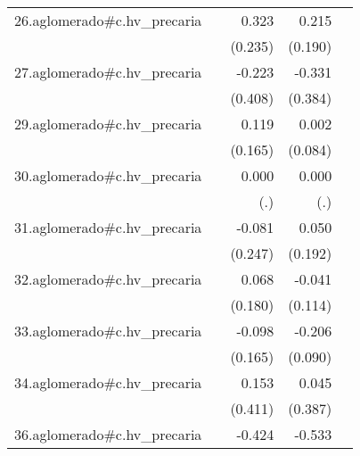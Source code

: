 {\begin{longtable}{l*{4}{D{.}{.}{-1}}}
\addlinespace
26.aglomerado#c.hv\_precaria&                     &       0.323         &       0.215         &                     \\
            &                     &     (0.235)         &     (0.190)         &                     \\
\addlinespace
27.aglomerado#c.hv\_precaria&                     &      -0.223         &      -0.331         &                     \\
            &                     &     (0.408)         &     (0.384)         &                     \\
\addlinespace
29.aglomerado#c.hv\_precaria&                     &       0.119         &       0.002         &                     \\
            &                     &     (0.165)         &     (0.084)         &                     \\
\addlinespace
30.aglomerado#c.hv\_precaria&                     &       0.000         &       0.000         &                     \\
            &                     &         (.)         &         (.)         &                     \\
\addlinespace
31.aglomerado#c.hv\_precaria&                     &      -0.081         &       0.050         &                     \\
            &                     &     (0.247)         &     (0.192)         &                     \\
\addlinespace
32.aglomerado#c.hv\_precaria&                     &       0.068         &      -0.041         &                     \\
            &                     &     (0.180)         &     (0.114)         &                     \\
\addlinespace
33.aglomerado#c.hv\_precaria&                     &      -0.098         &      -0.206\sym{*}  &                     \\
            &                     &     (0.165)         &     (0.090)         &                     \\
\addlinespace
34.aglomerado#c.hv\_precaria&                     &       0.153         &       0.045         &                     \\
            &                     &     (0.411)         &     (0.387)         &                     \\
\addlinespace
36.aglomerado#c.hv\_precaria&                     &      -0.424         &      -0.533         &                     \\

\end{longtable}}
